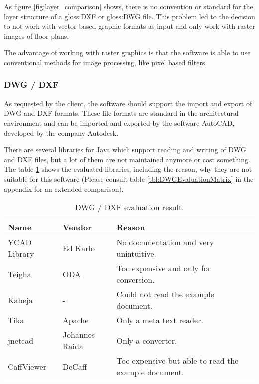 As figure \ref{fig:layer_comparison} shows, there is no convention or standard for the layer structure of a \gls{gloss:DXF} or \gls{gloss:DWG} file. This problem led to the decision to not work with vector based graphic formats as input and only work with raster images of floor plans.

The advantage of working with raster graphics is that the software is able to use conventional methods for image processing, like pixel based filters.

\subsubsection{DWG / DXF}
As requested by the client, the software should support the import and export of DWG and DXF formats. These file formats are standard in the architectural environment and can be imported and exported by the software AutoCAD, developed by the company Autodesk.

There are several libraries for Java which support reading and writing of DWG and DXF files, but a lot of them are not maintained anymore or cost something. The table \ref{tbl:DWGEvaluationResult} shows the evaluated libraries, including the reason, why they are not suitable for this software (Please consult table \ref{tbl:DWGEvaluationMatrix} in the appendix for an extended comparison).

\begin{table}[H]
\centering
\caption{DWG / DXF evaluation result.}
\label{tbl:DWGEvaluationResult}
\begin{tabular}{@{}lll@{}}
\toprule
Name         & Vendor         & Reason                                               \\ \midrule
YCAD Library & Ed Karlo       & No documentation and very unintuitive.                \\
Teigha       & ODA            & Too expensive and only for conversion.               \\
Kabeja       & -              & Could not read the example document.                 \\
Tika         & Apache         & Only a meta text reader.                             \\
jnetcad      & Johannes Raida & Only a converter.                                    \\
CaffViewer   & DeCaff         & Too expensive but able to read the example document. \\ \bottomrule
\end{tabular}
\end{table}

